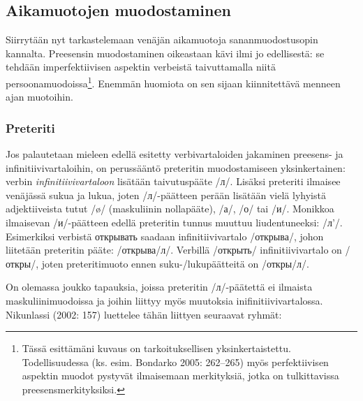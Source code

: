 \documentclass[]{scrartcl}
\begin{document}
\subsection{Aikamuotojen
muodostaminen}\label{aikamuotojen-muodostaminen}

Siirrytään nyt tarkastelemaan venäjän aikamuotoja sananmuodostusopin
kannalta. Preesensin muodostaminen oikeastaan kävi ilmi jo edellisestä:
se tehdään imperfektiivisen aspektin verbeistä taivuttamalla niitä
persoonamuodoissa\footnote{Tässä esittämäni kuvaus on tarkoituksellisen
  yksinkertaistettu. Todellisuudessa (ks. esim. Bondarko 2005: 262--265)
  myös perfektiivisen aspektin muodot pystyvät ilmaisemaan merkityksiä,
  jotka on tulkittavissa preesensmerkityksiksi.}. Enemmän huomiota on
sen sijaan kiinnitettävä menneen ajan muotoihin.

\subsubsection{Preteriti}\label{preteriti}

Jos palautetaan mieleen edellä esitetty verbivartaloiden jakaminen
preesens- ja infinitiivivartaloihin, on perussääntö preteritin
muodostamiseen yksinkertainen: verbin \emph{infinitiivivartaloon}
lisätään taivutuspääte /л/. Lisäksi preteriti ilmaisee venäjässä sukua
ja lukua, joten /л/-päätteen perään lisätään vielä lyhyistä
adjektiiveista tutut /ø/ (maskuliinin nollapääte), /а/, /о/ tai /и/.
Monikkoa ilmaisevan /и/-päätteen edellä preteritin tunnus muuttuu
liudentuneeksi: /л'/. Esimerkiksi verbistä открывать saadaan
infinitiivivartalo /открыва/, johon liitetään preteritin pääte:
/открыва/л/. Verbillä /открыть/ infinitiivivartalo on /откры/, joten
preteritimuoto ennen suku-/lukupäätteitä on /откры/л/.

On olemassa joukko tapauksia, joissa preteritin /л/-päätettä ei ilmaista
maskuliinimuodoissa ja joihin liittyy myös muutoksia
inifinitiivivartalossa. Nikunlassi (2002: 157) luettelee tähän liittyen
seuraavat ryhmät:
\end{document}

